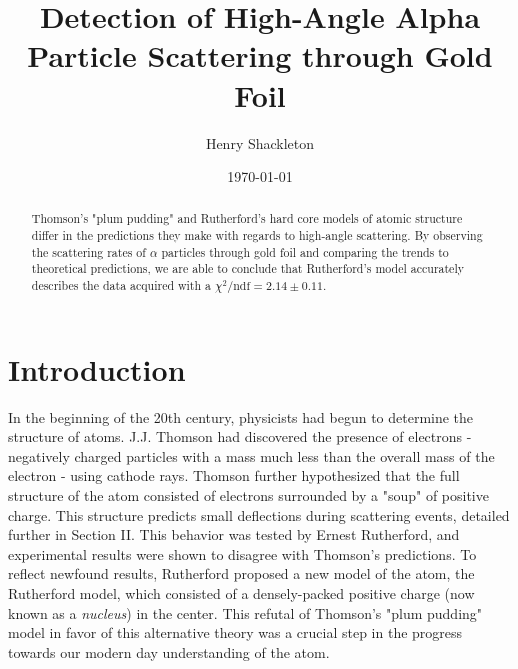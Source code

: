 \usepackage{graphicx}      %
\usepackage{lipsum}
\usepackage{float}
\usepackage{bm}            %
\usepackage{physics}
\usepackage{tensor}
\usepackage{gensymb}
\usepackage[colorlinks=true]{hyperref}  %




\title{Detection of High-Angle Alpha Particle Scattering through Gold Foil}
\author{Henry Shackleton}
\date{\today}


\begin{abstract}
  Thomson's "plum pudding" and Rutherford's hard core models of atomic structure differ in the predictions they make with regards to high-angle scattering. By observing the scattering rates of $\alpha$ particles through gold foil and comparing the trends to theoretical predictions, we are able to conclude that Rutherford's model accurately describes the data acquired with a $\chi^2/\text{ndf} = 2.14 \pm 0.11$.
\end{abstract}

\maketitle
\section{Introduction}
In the beginning of the 20th century, physicists had begun to determine the structure of atoms. J.J. Thomson had discovered the presence of electrons - negatively charged particles with a mass much less than the overall mass of the electron - using cathode rays\cite{electron}. Thomson further hypothesized that the full structure of the atom consisted of electrons surrounded by a "soup" of positive charge. This structure predicts small deflections during scattering events, detailed further in Section II. This behavior was tested by Ernest Rutherford, and experimental results were shown to disagree with Thomson's predictions. To reflect newfound results, Rutherford proposed a new model of the atom, the Rutherford model, which consisted of a densely-packed positive charge (now known as a \textit{nucleus}) in the center. This refutal of Thomson's "plum pudding" model in favor of this alternative theory  was a crucial step in the progress towards our modern day understanding of the atom.


